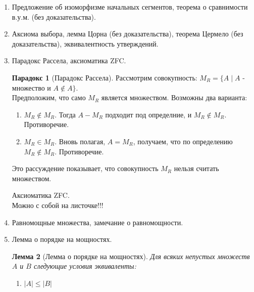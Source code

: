 \documentclass[a4paper]{article}
\newtheorem*{lemma*}{Лемма}
\theoremstyle{definition}
\newtheorem*{paradoks}{Парадокс}
\begin{document}
\begin{enumerate}
       \begin{lemma*}[о начальных сегментах в.у.м.]
        Любой начальный сегмент в.у.м. $(A, \leq)$ либо равен $A$, либо является начальным отрезком.
       \end{lemma*}
       \begin{proof}
        Пусть $S$ - начальный сегмент в $A$ и $S \neq A$. Тогда $A \backslash S \neq \emptyset$. Пусть $x$ - минимальный элемент в $A \backslash S$. Покажем, что $S = A_x$. Если $y \in S$, то либо $y < x$, либо $x \leq y$. Второй случай невозможен, так как тогда $x \in S$.
       \end{proof}
 \item Предложение об изоморфизме начальных сегментов, теорема о сравнимости в.у.м. (без доказательства).
 \item Аксиома выбора, лемма Цорна (без доказательства), теорема Цермело (без доказательства), эквивалентность утверждений.
 \item Парадокс Рассела, аксиоматика ZFC.
       \begin{paradoks}[Парадокс Рассела]
        Рассмотрим совокупность:
        $M_{R} = \{ A \mid  A$ - множество и $A  \notin A \}$.\\
        Предположим, что само $M_{R}$ является множеством. Возможны два варианта:\\
        \begin{enumerate}
         \item $M_{R} \notin{M_{R}}$. Тогда $A - M_{R}$ подходит под определние, и $M_{R} \notin{M_{R}}$. Противоречие.
         \item $M_{R} \in{M_{R}}$. Вновь полагая, $A = M_{R}$, получаем, что по определению $M_{R} \notin{M_{R}}$. Противоречие.
        \end{enumerate}
        Это рассуждение показывает, что совокупность $M_{R}$ нельзя считать множеством.
       \end{paradoks}
       Аксиоматика ZFC.\\
       Можно с собой на листочке!!!
 \item Равномощные множества, замечание о равномощности.
 \item Лемма о порядке на мощностях.
       \begin{lemma*}[Лемма о порядке на мощностях]
        Для всяких непустых множеств $A$ и $B$ следующие условия эквиваленты:
        \begin{enumerate}
         \item $\left | A \right | \leq \left | B \right |$

\end{enumerate}
\end{lemma*}
\end{enumerate}
\end{document}
